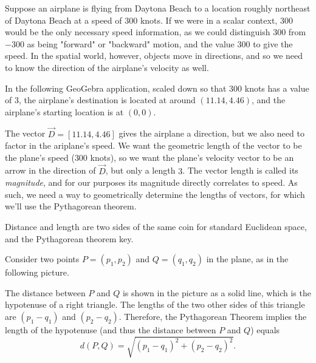 \documentclass{ximera}
\begin{document}
\begin{example}
    
  Suppose an airplane is flying from Daytona Beach to a location roughly northeast of Daytona Beach at a speed of $300$ knots. If we were in a scalar context, $300$ would be the only necessary speed information, as we could distinguish $300$ from $-300$ as being "forward" or "backward" motion, and the value $300$ to give the speed. In the spatial world, however, objects move in directions, and so we need to know the direction of the airplane's velocity as well.

  In the following GeoGebra application, scaled down so that $300$ knots has a value of $3$, the airplane's destination is located at around $(11.14,4.46)$, and the airplane's starting location is at $(0,0)$. 

  \begin{center}
  \end{center}

  The vector $\vec{D}=[11.14,4.46]$ gives the airplane a direction, but we also need to factor in the ariplane's speed. We want the geometric length of the vector to be the plane's speed ($300$ knots), so we want the plane's velocity vector to be an arrow in the direction of $\vec{D}$, but only a length $3$. The vector length is called its \textit{magnitude}, and for our purposes its magnitude directly correlates to speed. As such, we need a way to geometrically determine the lengths of vectors, for which we'll use the Pythagorean theorem.

  \begin{remark}

    Distance and length are two sides of the same coin for standard Euclidean space, and the Pythagorean theorem key.

    Consider two points $P=(p_1,p_2)$ and
    $Q=(q_1,q_2)$ in the plane, as in the following picture.
   

    The distance between $P$ and $Q$ is shown in the picture as a solid
    line, which is the hypotenuse of a right triangle.  The lengths of the
    two other sides of this triangle are $(p_1-q_1)$ and
    $(p_2-q_2)$. Therefore, the Pythagorean Theorem implies the
    length of the hypotenuse (and thus the distance between $P$ and $Q$)
    equals
    \begin{equation*}
      d(P,Q)
      =\sqrt{(p_1-q_1)^2+(p_2-q_2)^2}.
    \end{equation*}


\end{remark}
\end{example}
\end{document}
